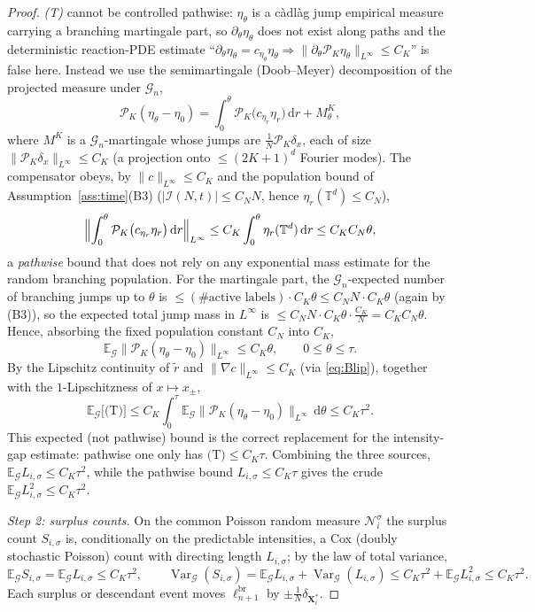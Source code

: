 \documentclass[a4paper,fleqn]{cas-sc}
\theoremstyle{definition}
\theoremstyle{remark}
\begin{document}
\begin{proof}
\emph{(T)} cannot be controlled pathwise: $\eta_\theta$ is a c\`adl\`ag jump
empirical measure carrying a branching martingale part, so $\partial_\theta\eta_\theta$
does not exist along paths and the deterministic reaction-PDE estimate
``$\partial_\theta\eta_\theta=c_{\eta_\theta}\eta_\theta\Rightarrow
\|\partial_\theta\mathcal P_K\eta_\theta\|_{L^\infty}\le C_K$'' is false here.
Instead we use the semimartingale (Doob--Meyer) decomposition of the projected
measure under $\mathcal G_n$,
\[
\mathcal P_K(\eta_\theta-\eta_0)
=\int_0^\theta\mathcal P_K\bigl(c_{\eta_r}\eta_r\bigr)\,\mathrm dr+M^K_\theta,
\]
where $M^K$ is a $\mathcal G_n$-martingale whose jumps are $\frac1N\mathcal P_K\delta_x$,
each of size $\|\mathcal P_K\delta_x\|_{L^\infty}\le C_K$ (a projection onto
$\le(2K+1)^d$ Fourier modes). The compensator obeys, by $\|c\|_{L^\infty}\le C_K$
and the population bound of Assumption~\ref{ass:time}(B3)
($|\mathcal I(N,t)|\le C_NN$, hence $\eta_r(\mathbb T^d)\le C_N$),
\[
\Bigl\|\int_0^\theta\mathcal P_K\bigl(c_{\eta_r}\eta_r\bigr)\,\mathrm dr\Bigr\|_{L^\infty}
\le C_K\int_0^\theta\eta_r(\mathbb T^d)\,\mathrm dr\le C_KC_N\theta,
\]
a \emph{pathwise} bound that does not rely on any exponential mass estimate for the
random branching population. For the martingale part, the $\mathcal G_n$-expected
number of branching jumps up to $\theta$ is
$\le(\#\text{active labels})\cdot C_K\theta\le C_NN\cdot C_K\theta$ (again by (B3)),
so the expected total jump mass in $L^\infty$ is
$\le C_NN\cdot C_K\theta\cdot\frac{C_K}{N}=C_KC_N\theta$. Hence, absorbing the
fixed population constant $C_N$ into $C_K$,
\[
\mathbb E_{\mathcal G}\bigl\|\mathcal P_K(\eta_\theta-\eta_0)\bigr\|_{L^\infty}\le C_K\theta,
\qquad 0\le\theta\le\tau.
\]
By the Lipschitz continuity of $\tilde r$ and $\|\nabla c\|_{L^\infty}\le C_K$
(via \eqref{eq:Blip}), together with the $1$-Lipschitzness of $x\mapsto x_\pm$,
\[
\mathbb E_{\mathcal G}\bigl[\text{(T)}\bigr]
\le C_K\int_0^\tau\mathbb E_{\mathcal G}\bigl\|\mathcal P_K(\eta_\theta-\eta_0)\bigr\|_{L^\infty}\,\mathrm d\theta
\le C_K\tau^2 .
\]
This expected (not pathwise) bound is the correct replacement for the
intensity-gap estimate: pathwise one only has $\text{(T)}\le C_K\tau$. Combining
the three sources, $\mathbb E_{\mathcal G}L_{i,\sigma}\le C_K\tau^2$, while the
pathwise bound $L_{i,\sigma}\le C_K\tau$ gives the crude
$\mathbb E_{\mathcal G}L_{i,\sigma}^2\le C_K\tau^2$.

\emph{Step 2: surplus counts.} On the common Poisson random measure
$\mathcal N^\sigma_i$ the surplus count $S_{i,\sigma}$ is, conditionally on the
predictable intensities, a Cox (doubly stochastic Poisson) count with directing
length $L_{i,\sigma}$; by the law of total variance,
\[
\mathbb E_{\mathcal G}S_{i,\sigma}=\mathbb E_{\mathcal G}L_{i,\sigma}\le C_K\tau^2,
\qquad
\operatorname{Var}_{\mathcal G}(S_{i,\sigma})
=\mathbb E_{\mathcal G}L_{i,\sigma}+\operatorname{Var}_{\mathcal G}(L_{i,\sigma})
\le C_K\tau^2+\mathbb E_{\mathcal G}L_{i,\sigma}^2\le C_K\tau^2 .
\]
Each surplus or descendant event moves $\ell^{\mathrm{br}}_{n+1}$ by
$\pm\frac1N\delta_{\mathbf X^*_i}$.


\end{proof}
\end{document}
